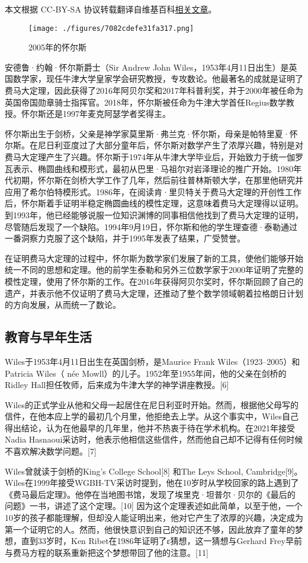 
本文根据 CC-BY-SA 协议转载翻译自维基百科\href{https://en.wikipedia.org/wiki/Andrew_Wiles}{相关文章}。

\begin{figure}[ht]
\centering
\texttt{[image: ./figures/7082cdefe31fa317.png]}
\caption{2005年的怀尔斯} \label{fig_Andrew_1}
\end{figure}
安德鲁·约翰·怀尔斯爵士（Sir Andrew John Wiles，1953年4月11日出生）是英国数学家，现任牛津大学皇家学会研究教授，专攻数论。他最著名的成就是证明了费马大定理，因此获得了2016年阿贝尔奖和2017年科普利奖，并于2000年被任命为英国帝国勋章骑士指挥官。2018年，怀尔斯被任命为牛津大学首任Regius数学教授。怀尔斯还是1997年麦克阿瑟学者奖得主。

怀尔斯出生于剑桥，父亲是神学家莫里斯·弗兰克·怀尔斯，母亲是帕特里夏·怀尔斯。在尼日利亚度过了大部分童年后，怀尔斯对数学产生了浓厚兴趣，特别是对费马大定理产生了兴趣。怀尔斯于1974年从牛津大学毕业后，开始致力于统一伽罗瓦表示、椭圆曲线和模形式，最初从巴里·马祖尔对岩泽理论的推广开始。1980年代初期，怀尔斯在剑桥大学工作了几年，然后前往普林斯顿大学，在那里他研究并应用了希尔伯特模形式。1986年，在阅读肯·里贝特关于费马大定理的开创性工作后，怀尔斯着手证明半稳定椭圆曲线的模性定理，这意味着费马大定理得以证明。到1993年，他已经能够说服一位知识渊博的同事相信他找到了费马大定理的证明，尽管随后发现了一个缺陷。1994年9月19日，怀尔斯和他的学生理查德·泰勒通过一番洞察力克服了这个缺陷，并于1995年发表了结果，广受赞誉。

在证明费马大定理的过程中，怀尔斯为数学家们发展了新的工具，使他们能够开始统一不同的思想和定理。他的前学生泰勒和另外三位数学家于2000年证明了完整的模性定理，使用了怀尔斯的工作。在2016年获得阿贝尔奖时，怀尔斯回顾了自己的遗产，并表示他不仅证明了费马大定理，还推动了整个数学领域朝着拉格朗日计划的方向发展，从而统一了数论。
\subsection{教育与早年生活}  
Wiles于1953年4月11日出生在英国剑桥，是Maurice Frank Wiles（1923–2005）和Patricia Wiles（ née Mowll）的儿子。1952年至1955年间，他的父亲在剑桥的Ridley Hall担任牧师，后来成为牛津大学的神学讲座教授。[6]  

Wiles的正式学业从他和父母一起居住在尼日利亚时开始。然而，根据他父母写的信件，在他本应上学的最初几个月里，他拒绝去上学。从这个事实中，Wiles自己得出结论，认为在他最早的几年里，他并不热衷于待在学术机构。在2021年接受Nadia Hasnaoui采访时，他表示他相信这些信件，然而他自己却不记得有任何时候不喜欢解决数学问题。[7]  

Wiles曾就读于剑桥的King's College School[8] 和The Leys School, Cambridge[9]。Wiles在1999年接受WGBH-TV采访时提到，他在10岁时从学校回家的路上遇到了《费马最后定理》。他停在当地图书馆，发现了埃里克·坦普尔·贝尔的《最后的问题》一书，讲述了这个定理。[10] 因为这个定理表述如此简单，以至于他，一个10岁的孩子都能理解，但却没人能证明出来，他对它产生了浓厚的兴趣，决定成为第一个证明它的人。然而，他很快意识到自己的知识还不够，因此放弃了童年的梦想，直到33岁时，Ken Ribet在1986年证明了ε猜想，这一猜想与Gerhard Frey早前与费马方程的联系重新把这个梦想带回了他的注意。[11]